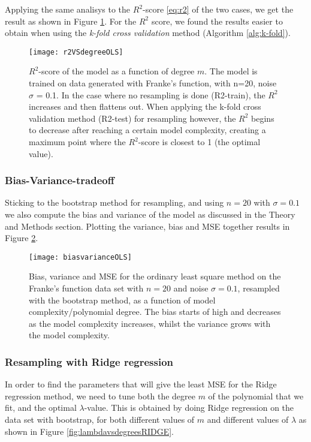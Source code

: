 Applying the same analisys to the $R^2$-score \eqref{eq:r2} of the two cases, we get the result as shown in Figure \ref{fig:r2VSdegreeOLS}. For the $R^2$ score, we found the results easier to obtain when using the \emph{k-fold cross validation} method (Algorithm \ref{alg:k-fold}).
\begin{figure}[htbp]
	\centering
	\texttt{[image: r2VSdegreeOLS]}
	\caption{$R^2$-score of the model as a function of degree $m$. The model is trained on data generated with Franke's function, with n=20, noise $\sigma$ = 0.1. In the case where no resampling is done (R2-train), the $R^2$ increases and then flattens out. When applying the k-fold cross validation method (R2-test) for resampling however, the $R^2$ begins to decrease after reaching a certain model complexity, creating a maximum point where the $R^2$-score is closest to 1 (the optimal value).}
	\label{fig:r2VSdegreeOLS}
\end{figure}

\subsubsection{Bias-Variance-tradeoff}
Sticking to the bootstrap method for resampling, and using $n=20$ with $\sigma = 0.1$ we also compute the bias and variance of the model as discussed in the Theory and Methods section. Plotting the variance, bias and MSE together results in Figure \ref{fig:biasvarianceOLS}.

\begin{figure}[htbp]
	\centering
	\texttt{[image: biasvarianceOLS]}
	\caption{Bias, variance and MSE for the ordinary least square method on the Franke's function data set with $n=20$ and noise $\sigma=0.1$, resampled with the bootstrap method, as a function of model complexity/polynomial degree. The bias starts of high and decreases as the model complexity increases, whilst the variance grows with the model complexity.}
	\label{fig:biasvarianceOLS}
\end{figure}

\subsubsection{Resampling with Ridge regression}
In order to find the parameters that will give the least MSE for the Ridge regression method, we need to tune both the degree $m$ of the polynomial that we fit, and the optimal $\lambda$-value. This is obtained by doing Ridge regression on the data set with bootstrap, for both different values of $m$ and different values of $\lambda$ as shown in Figure \ref{fig:lambdavsdegreesRIDGE}.

